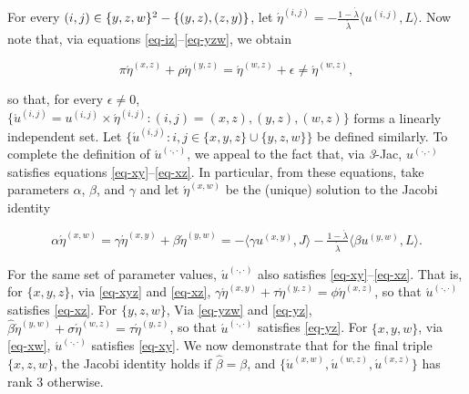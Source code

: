 \documentclass[12pt,a4paper,twoside]{article}
\renewcommand{\ij}{{(i, j)}}
\newcommand{\xy}{{(x, y)}}
\newcommand{\yz}{{(y,z)}}
\newcommand{\xz}{{(x,z)}}
\newcommand{\xw}{{(x,w)}}
\newcommand{\yw}{{(y,w)}}
\newcommand{\wz}{(w,z)}
\newcommand{\dd}{{(\cdot,\cdot)}}
\newcommand{\threejac}{\textup{\textit{3}-Jac}}
\begin{document}
\begin{appendices}
For every $(i, j) \in \{y,z,w\}^2 - \{(y, z), (z, y)\}$, let
$\acute{\eta}^{\ij} = - \frac{1 - \acute{\lambda}}{\acute{\lambda}} \langle
u^{\ij}, L \rangle$.  Now note that, via equations
\eqref{eq-iz}--\eqref{eq-yzw}, we obtain
\begin{linenomath*}
  \begin{equation}\label{eq-3d-epsilon}
    \pi  \acute{\eta}^{\xz} + \rho  \acute{\eta}^{\yz} = \acute{\eta}^{\wz} + \epsilon \neq
    \acute{\eta}^{\wz},
  \end{equation}
\end{linenomath*}
so that, for every $\epsilon\neq 0$,
$\{\acute{u}^{\ij} = u^{\ij} \times \acute{\eta}^{\ij}: \ij = \xz, \yz, \wz\}$
forms a linearly independent set. Let
$\{\acute{u}^{\ij}: i,j \in \{x,y,z\}\cup \{y,z,w\}\}$ be defined similarly. To
complete the definition of $\acute{u}^{\dd}$, we appeal to the fact that, via
\threejac, $u^{\dd}$ satisfies equations \eqref{eq-xy}--\eqref{eq-xz}. In
particular, from these equations, take parameters $\alpha$, $\beta$, and $\gamma$
and let $\acute{\eta}^{\xw}$ be the (unique) solution to the Jacobi identity
\begin{linenomath*}
  \begin{equation}\label{eq-xw}
    \alpha  \acute{\eta}^{\xw} =  \gamma  \acute{\eta}^{\xy} + \beta \acute{\eta}^{\yw} =
    -\langle \gamma  u^{\xy} , J \rangle -
    \tfrac{1-\acute{\lambda}}{\acute{\lambda}}\langle\beta u^{\yw}, L  \rangle.
  \end{equation}
\end{linenomath*}
For the same set of parameter values, $\acute{u}^{\dd}$ also satisfies
\eqref{eq-xy}--\eqref{eq-xz}. That is, for $\{x,y,z\}$, via \cref{eq-xyz} and \eqref{eq-xz},
$\gamma \acute{\eta}^{\xy}+\tau \acute{\eta}^{\yz} = \phi \acute{\eta}^{\xz}$,
so that $\acute{u}^{\dd}$ satisfies \eqref{eq-xz}. For $\{y,z,w\}$, Via \cref{eq-yzw} and
\eqref{eq-yz},
$\hat{\beta} \acute{\eta}^{\yw}+\sigma \acute{\eta}^{\wz} = \tau
\acute{\eta}^{\yz}$, so that $\acute{u}^{\dd}$ satisfies \eqref{eq-yz}. For $\{x,y,w\}$,
via \cref{eq-xw}, $\acute{u}^{\dd}$ satisfies \eqref{eq-xy}.  We now demonstrate
that for the final triple $\{x,z,w\}$,  the Jacobi identity holds if
$\hat{\beta} = \beta$, and  $\{\acute{u}^{\xw},\acute{u}^{\wz},\acute{u}^{\xz}\}$
has rank $3$ otherwise.


\end{appendices}
\end{document}

